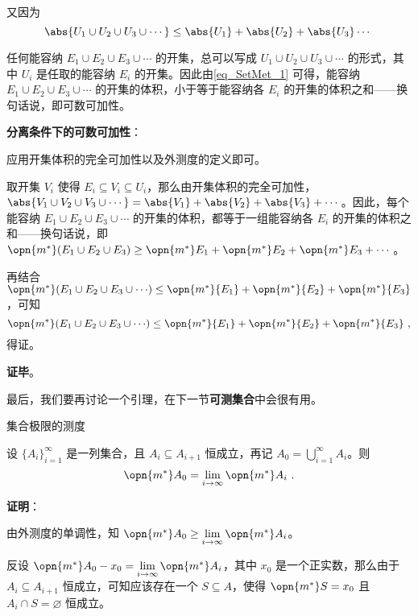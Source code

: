 又因为
\begin{equation}\label{eq_SetMet_1}
\abs{U_1\cup U_2\cup U_3\cup \cdots} \leq \abs{U_1}+\abs{U_2}+\abs{U_3}\cdots~
\end{equation}

任何能容纳 $E_1\cup E_2\cup E_3\cup \cdots $ 的开集，总可以写成 $U_1\cup U_2\cup U_3\cup \cdots$ 的形式，其中 $U_i$ 是任取的能容纳 $E_i$ 的开集。因此由\autoref{eq_SetMet_1} 可得，能容纳 $E_1\cup E_2\cup E_3\cup \cdots $ 的开集的体积，小于等于能容纳各 $E_i$ 的开集的体积之和——换句话说，即可数可加性。

\textbf{分离条件下的可数可加性}：

应用开集体积的完全可加性以及外测度的定义即可。

取开集 $V_i$ 使得 $E_i\subseteq V_i\subseteq U_i$，那么由开集体积的完全可加性，$\abs{V_1\cup V_2\cup V_3\cup \cdots}=\abs{V_1}+\abs{V_2}+\abs{V_3}+\cdots$。因此，每个能容纳 $E_1\cup E_2\cup E_3\cup\cdots$ 的开集的体积，都等于一组能容纳各 $E_i$ 的开集的体积之和——换句话说，即 $\opn{m^*}(E_1\cup E_2\cup E_3)\geq\opn{m^*}E_1+\opn{m^*}E_2+\opn{m^*}E_3+\cdots$。

再结合 $\opn{m^*}({E_1\cup E_2\cup E_3\cup \cdots})\leq \opn{m^*}{E_1}+\opn{m^*}{E_2}+\opn{m^*}{E_3}$，可知
\begin{equation}
\opn{m^*}({E_1\cup E_2\cup E_3\cup \cdots})\leq \opn{m^*}{E_1}+\opn{m^*}{E_2}+\opn{m^*}{E_3}~,
\end{equation}
得证。

\textbf{证毕}。

最后，我们要再讨论一个引理，在下一节\textbf{可测集合}中会很有用。

\begin{lemma}{集合极限的测度}\label{lem_SetMet_1}

设 $\{A_i\}_{i=1}^\infty$ 是一列集合，且 $A_{i}\subseteq A_{i+1}$ 恒成立，再记 $A_0=\bigcup_{i=1}^\infty A_i$。则
\begin{equation}
\opn{m^*}A_0=\lim\limits_{i\to\infty}\opn{m^*}A_i~.
\end{equation}

\end{lemma}


\textbf{证明}：

由外测度的单调性，知 $\opn{m^*}A_0\geq\lim\limits_{i\to\infty}\opn{m^*}A_i$。

反设 $\opn{m^*}A_0-x_0=\lim\limits_{i\to\infty}\opn{m^*}A_i$，其中 $x_0$ 是一个正实数，那么由于 $A_{i}\subseteq A_{i+1}$ 恒成立，可知应该存在一个 $S\subseteq A$，使得 $\opn{m^*}S=x_0$ 且 $A_i\cap S=\varnothing$ 恒成立。

